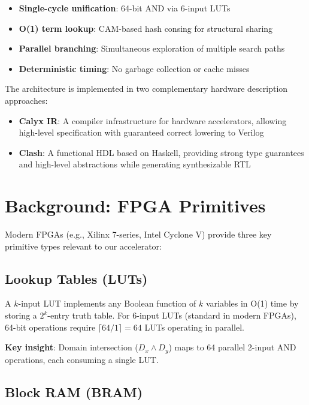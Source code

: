 \documentclass[11pt,a4paper]{article}
\begin{document}
\begin{itemize}
  \item \textbf{Single-cycle unification}: 64-bit AND via 6-input LUTs
  \item \textbf{O(1) term lookup}: CAM-based hash consing for structural sharing
  \item \textbf{Parallel branching}: Simultaneous exploration of multiple search paths
  \item \textbf{Deterministic timing}: No garbage collection or cache misses
\end{itemize}

The architecture is implemented in two complementary hardware description
approaches:
\begin{itemize}
  \item \textbf{Calyx IR}: A compiler infrastructure for hardware accelerators,
    allowing high-level specification with guaranteed correct lowering to Verilog
  \item \textbf{Clash}: A functional HDL based on Haskell, providing strong
    type guarantees and high-level abstractions while generating synthesizable RTL
\end{itemize}

\section{Background: FPGA Primitives}
\label{sec:background_chirho}

Modern FPGAs (e.g., Xilinx 7-series, Intel Cyclone V) provide three key
primitive types relevant to our accelerator:

\subsection{Lookup Tables (LUTs)}
\label{subsec:luts_chirho}

A $k$-input LUT implements any Boolean function of $k$ variables in O(1) time
by storing a $2^k$-entry truth table. For 6-input LUTs (standard in modern
FPGAs), 64-bit operations require $\lceil 64/1 \rceil = 64$ LUTs operating in
parallel.

\textbf{Key insight}: Domain intersection ($D_x \land D_y$) maps to 64
parallel 2-input AND operations, each consuming a single LUT.

\subsection{Block RAM (BRAM)}
\label{subsec:bram_chirho}
\end{document}
